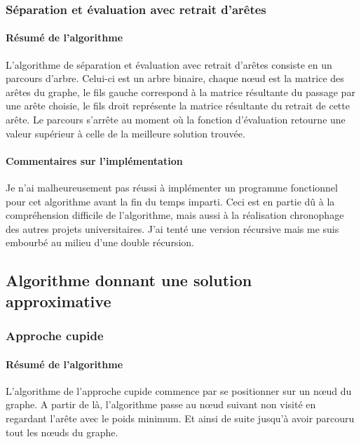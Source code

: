 \documentclass[10pt,a4paper]{report}
\begin{document}
		
		
		\subsubsection{Séparation et évaluation avec retrait d'arêtes}		
		
		\paragraph{Résumé de l'algorithme\\}
		\begin{flushleft}
		L'algorithme de séparation et évaluation avec retrait d'arêtes consiste en un parcours d'arbre. Celui-ci est un arbre binaire, chaque nœud est la matrice des arêtes du graphe, le fils gauche correspond à la matrice résultante du passage par une arête choisie, le fils droit représente la matrice résultante du retrait de cette arête. Le parcours s'arrête au moment où la fonction d'évaluation retourne une valeur supérieur à celle de la meilleure solution trouvée.\\
		\end{flushleft}
		
		\paragraph{Commentaires sur l'implémentation\\}
		\begin{flushleft}
		Je n'ai malheureusement pas réussi à implémenter un programme fonctionnel pour cet algorithme avant la fin du temps imparti. Ceci est en partie dû à la compréhension difficile de l'algorithme, mais aussi à la réalisation chronophage des autres projets universitaires.
		J'ai tenté une version récursive mais me suis embourbé au milieu d'une double récursion.
		\end{flushleft}
		
		
	\subsection{Algorithme donnant une solution approximative}
	
		\subsubsection{Approche cupide}
		
		\paragraph{Résumé de l'algorithme\\}
		\begin{flushleft}
		L'algorithme de l'approche cupide commence par se positionner sur un nœud du graphe. A partir de là, l'algorithme passe au nœud suivant non visité en regardant l'arête avec le poids minimum. Et ainsi de suite jusqu'à avoir parcouru tout les nœuds du graphe.
		\end{flushleft}
		
\end{document}
